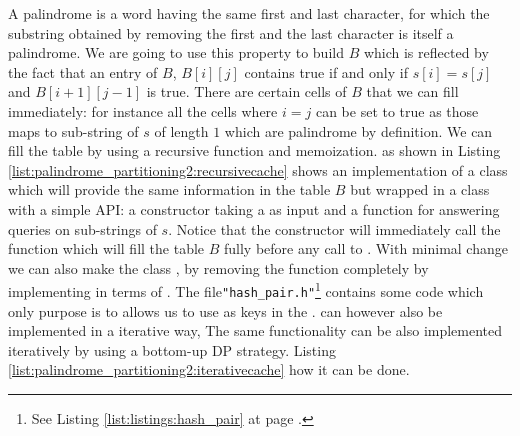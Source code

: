 A palindrome is a word having the same first and last character, for which the substring obtained by
removing the first and the last character is itself a palindrome. We are going to use this property
to build $B$ which is reflected by the fact that an entry of $B$, $B[i][j]$ contains true if and
only if $s[i]=s[j]$ and $B[i+1][j-1]$ is true. There are certain cells of $B$ that we can fill
immediately: for instance all the cells where $i=j$ can be set to true as those maps to sub-string
of $s$ of length $1$ which are palindrome by definition. We can fill the table by using a  recursive
function and memoization. as shown in Listing \ref{list:palindrome_partitioning2:recursivecache}
shows an implementation of a class which will provide the same information in the table $B$ but
wrapped in a class with a simple API: a constructor taking a  as input and a
function  for answering queries on
sub-strings of $s$. Notice that the constructor will immediately call the function 
which will fill the table $B$ fully before any call to . With minimal change
we can also make the class , by removing the
 function completely by implementing  in terms of
. The file\texttt{"hash\_pair.h"}\footnote{See Listing
\ref{list:listings:hash_pair} at page \pageref{list:listings:hash_pair}.} contains some code which
only purpose is to allows us to use  as keys in the
. can however also be implemented in a iterative way, The same
functionality can be also implemented iteratively by using a bottom-up DP strategy. Listing
\ref{list:palindrome_partitioning2:iterativecache} how it can be done.





